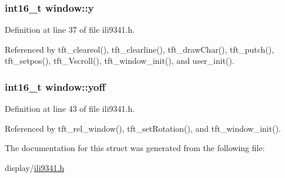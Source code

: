 \hypertarget{structwindow_a95c7023fc42e79ab42c291b90a490776}{
\subsubsection[{y}]{\setlength{\rightskip}{0pt plus 5cm}int16\-\_\-t window\-::y}}\label{structwindow_a95c7023fc42e79ab42c291b90a490776}


Definition at line 37 of file ili9341.\-h.



Referenced by tft\-\_\-cleareol(), tft\-\_\-clearline(), tft\-\_\-draw\-Char(), tft\-\_\-putch(), tft\-\_\-setpos(), tft\-\_\-\-Vscroll(), tft\-\_\-window\-\_\-init(), and user\-\_\-init().

\hypertarget{structwindow_a95c482caa25e4a283d962643d410bc29}{
\subsubsection[{yoff}]{\setlength{\rightskip}{0pt plus 5cm}int16\-\_\-t window\-::yoff}}\label{structwindow_a95c482caa25e4a283d962643d410bc29}


Definition at line 43 of file ili9341.\-h.



Referenced by tft\-\_\-rel\-\_\-window(), tft\-\_\-set\-Rotation(), and tft\-\_\-window\-\_\-init().



The documentation for this struct was generated from the following file\-:\begin{DoxyCompactItemize}
\item 
display/\hyperlink{ili9341_8h}{ili9341.\-h}\end{DoxyCompactItemize}
